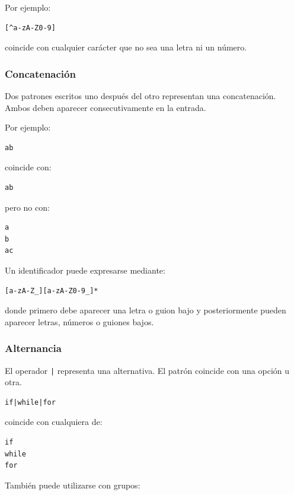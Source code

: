 \documentclass{article}
\begin{document}
Por ejemplo:

\begin{verbatim}
[^a-zA-Z0-9]
\end{verbatim}

coincide con cualquier carácter que no sea una letra ni un número.

\subsubsection{Concatenación}

Dos patrones escritos uno después del otro representan una concatenación.
Ambos deben aparecer consecutivamente en la entrada.

Por ejemplo:

\begin{verbatim}
ab
\end{verbatim}

coincide con:

\begin{verbatim}
ab
\end{verbatim}

pero no con:

\begin{verbatim}
a
b
ac
\end{verbatim}

Un identificador puede expresarse mediante:

\begin{verbatim}
[a-zA-Z_][a-zA-Z0-9_]*
\end{verbatim}

donde primero debe aparecer una letra o guion bajo y posteriormente
pueden aparecer letras, números o guiones bajos.

\subsubsection{Alternancia}

El operador \texttt{|} representa una alternativa. El patrón coincide con
una opción u otra.

\begin{verbatim}
if|while|for
\end{verbatim}

coincide con cualquiera de:

\begin{verbatim}
if
while
for
\end{verbatim}

También puede utilizarse con grupos:
\end{document}
